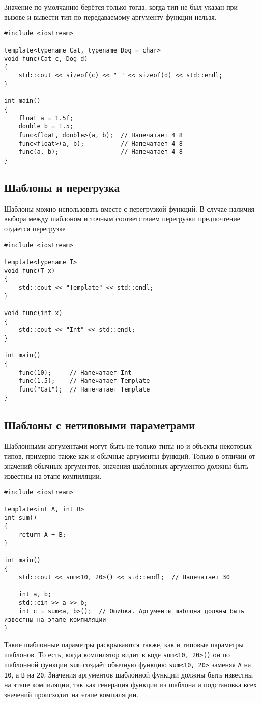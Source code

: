 \documentclass{article}
\begin{document}
\newpage
Значение по умолчанию берётся только тогда, когда тип не был указан при вызове и вывести тип по передаваемому аргументу функции нельзя.
\begin{lstlisting}
#include <iostream>

template<typename Cat, typename Dog = char>
void func(Cat c, Dog d)
{
    std::cout << sizeof(c) << " " << sizeof(d) << std::endl;
}

int main()
{
    float a = 1.5f;
    double b = 1.5;
    func<float, double>(a, b);  // Напечатает 4 8
    func<float>(a, b);          // Напечатает 4 8
    func(a, b);                 // Напечатает 4 8
}
\end{lstlisting}
\subsection*{Шаблоны и перегрузка}
Шаблоны можно использовать вместе с перегрузкой функций.
В случае наличия выбора между шаблоном и точным соответствием перегрузки предпочтение отдается перегрузке
\begin{lstlisting}
#include <iostream>

template<typename T>
void func(T x)
{
    std::cout << "Template" << std::endl;
}

void func(int x)
{
	std::cout << "Int" << std::endl;
}

int main()
{
    func(10);     // Напечатает Int
    func(1.5);    // Напечатает Template
    func("Cat");  // Напечатает Template
}
\end{lstlisting}

\newpage
\subsection*{Шаблоны с нетиповыми параметрами}
Шаблонными аргументами могут быть не только типы но и объекты некоторых типов, примерно также как и обычные аргументы функций. Только в отличии от значений обычных аргументов, значения шаблонных аргументов должны быть известны на этапе компиляции.
\begin{lstlisting}
#include <iostream>

template<int A, int B>
int sum() 
{
    return A + B;
}

int main() 
{
    std::cout << sum<10, 20>() << std::endl;  // Напечатает 30
    
    int a, b;
    std::cin >> a >> b;
    int c = sum<a, b>();  // Ошибка. Аргументы шаблона должны быть известны на этапе компиляции
}
\end{lstlisting}
Такие шаблонные параметры раскрываются также, как и типовые параметры шаблонов. То есть, когда компилятор видит в коде \lstinline|sum<10, 20>()| он по шаблонной функции \texttt{sum} создаёт обычную функцию \texttt{sum<10, 20>} заменяя \texttt{A} на \texttt{10}, а \texttt{B} на \texttt{20}. Значения аргументов шаблонной функции должны быть известны на этапе компиляции, так как генерация функции из шаблона и подстановка всех значений происходит на этапе компиляции.
\end{document}
